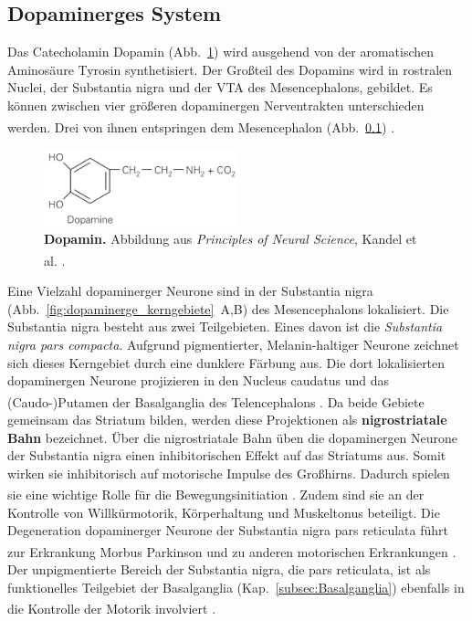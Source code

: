 \subsection{Dopaminerges System}
\label{dopaminerges_system}
Das Catecholamin Dopamin (Abb.~\ref{fig:dopamin}) wird ausgehend von der aromatischen Aminosäure Tyrosin synthetisiert. Der Großteil des Dopamins wird in rostralen Nuclei, der Substantia nigra  und der VTA des Mesencephalons, gebildet. Es können zwischen vier größeren dopaminergen Nerventrakten unterschieden werden. Drei von ihnen entspringen dem Mesencephalon (Abb.~\ref{dopaminerges_system}) \textsuperscript{\cite[Kap.~13]{kandel2013principles}}. 


\begin{figure}[H]
    \centering
    \includegraphics[width=0.5\textwidth]{pictures/Bilder_monoamine_systeme/dopamin.PNG}
    \caption[Dopamin]{\textbf{Dopamin.} Abbildung aus \textit{Principles of Neural Science}, Kandel et al. \textsuperscript{\cite[Kap.~13]{kandel2013principles}}.}
    \label{fig:dopamin}
\end{figure}{}

Eine Vielzahl dopaminerger Neurone sind in der Substantia nigra (Abb.~\ref{fig:dopaminerge_kerngebiete}~A,B) des Mesencephalons lokalisiert.
Die Substantia nigra besteht aus zwei Teilgebieten. Eines davon ist die \textit{Substantia nigra pars compacta}. 
Aufgrund pigmentierter, Melanin-haltiger Neurone zeichnet sich dieses Kerngebiet durch eine dunklere Färbung aus.
Die dort lokalisierten dopaminergen Neurone projizieren in den Nucleus caudatus und das (Caudo-)Putamen der Basalganglia des Telencephalons \textsuperscript{\cite[Kap.~9]{crossman2014neuroanatomy}}.
Da beide Gebiete gemeinsam das Striatum bilden, werden diese Projektionen als \textbf{nigrostriatale Bahn}  bezeichnet.
Über die nigrostriatale Bahn üben die dopaminergen Neurone der Substantia nigra einen inhibitorischen Effekt auf das Striatums aus. Somit wirken sie inhibitorisch auf motorische Impulse des Großhirns.
Dadurch spielen sie eine wichtige Rolle für die Bewegungsinitiation \textsuperscript{\cite[Kap.~6]{trepel2011neuroanatomie}}.
Zudem sind sie an der Kontrolle von Willkürmotorik, Körperhaltung und Muskeltonus beteiligt. Die Degeneration dopaminerger Neurone der Substantia nigra pars reticulata führt zur Erkrankung Morbus Parkinson \textsuperscript{\cite[Kap.~9]{crossman2014neuroanatomy}} und zu anderen motorischen Erkrankungen \textsuperscript{\cite[Kap.~13]{kandel2013principles}}.
Der unpigmentierte Bereich der Substantia nigra, die pars reticulata, ist als funktionelles Teilgebiet der Basalganglia (Kap.~\ref{subsec:Basalganglia}) ebenfalls in die Kontrolle der Motorik involviert \textsuperscript{\cite[Kap.~9]{crossman2014neuroanatomy}}.

